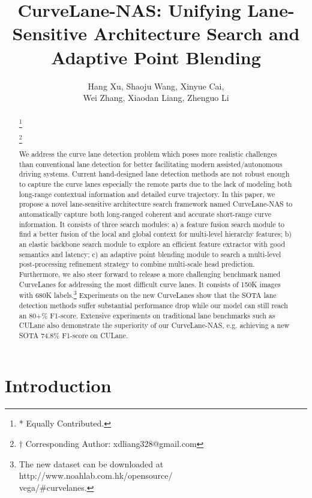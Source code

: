 \documentclass[runningheads]{llncs}
\author{Hang Xu\inst{*}\inst{1}, Shaoju Wang\inst{*}\inst{2}, Xinyue Cai\inst{1},\\ Wei Zhang\inst{1}, Xiaodan Liang\inst{\dagger}\inst{2}, Zhenguo Li\inst{1}}
\institute{Huawei Noah's Ark Lab \and
	Sun Yat-sen University}
\newcommand\blfootnote[1]{\begingroup
	\renewcommand\thefootnote{}\footnote{#1}\addtocounter{footnote}{-1}\endgroup
}
\begin{document}
\title{CurveLane-NAS: Unifying Lane-Sensitive Architecture Search and Adaptive
 Point Blending}
\maketitle
\begin{abstract}
\blfootnote{* Equally Contributed.}
\blfootnote{$\dagger$ Corresponding Author: xdliang328@gmail.com}
We address the curve lane detection problem which poses more realistic
challenges than conventional lane detection for better facilitating
modern assisted/autonomous driving systems. Current hand-designed
lane detection methods are not robust enough to capture the curve
lanes especially the remote parts due to the lack of modeling both
long-range contextual information and detailed curve trajectory. In
this paper, we propose a novel lane-sensitive architecture search
framework named CurveLane-NAS to automatically capture both long-ranged
coherent and accurate short-range curve information. It consists of three search modules: a) a feature
fusion search module to find a better fusion of the local and global
context for multi-level hierarchy features; b) an elastic backbone
search module to explore an efficient feature extractor with good
semantics and latency; c) an adaptive point blending module to search
a multi-level post-processing refinement strategy to combine multi-scale
head prediction. Furthermore,
we also steer forward to release a more challenging benchmark named
CurveLanes for addressing the most difficult curve lanes. It consists
of 150K images with 680K labels.\footnote{The new dataset can be downloaded at http://www.noahlab.com.hk/opensource/\\vega/\#curvelanes.} Experiments on the new CurveLanes show that the SOTA lane detection
methods suffer substantial performance drop while our model can still
reach an 80+\% F1-score. Extensive experiments on traditional lane
benchmarks such as CULane also demonstrate the superiority of our
CurveLane-NAS, e.g. achieving a new SOTA 74.8\% F1-score on CULane.

\end{abstract}



\section{Introduction}
\end{document}
